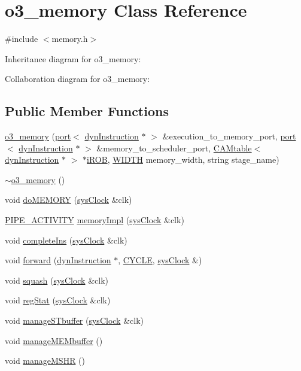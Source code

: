 \hypertarget{classo3__memory}{
\section{o3\_\-memory Class Reference}
\label{classo3__memory}
}


{\ttfamily \#include $<$memory.h$>$}



Inheritance diagram for o3\_\-memory:


Collaboration diagram for o3\_\-memory:
\subsection*{Public Member Functions}
\begin{DoxyCompactItemize}
\item 
\hyperlink{classo3__memory_aa34c08bd63c8de093d6df7e9022045fe}{o3\_\-memory} (\hyperlink{classport}{port}$<$ \hyperlink{classdynInstruction}{dynInstruction} $\ast$ $>$ \&execution\_\-to\_\-memory\_\-port, \hyperlink{classport}{port}$<$ \hyperlink{classdynInstruction}{dynInstruction} $\ast$ $>$ \&memory\_\-to\_\-scheduler\_\-port, \hyperlink{classCAMtable}{CAMtable}$<$ \hyperlink{classdynInstruction}{dynInstruction} $\ast$ $>$ $\ast$\hyperlink{backend_2parser_8cpp_ad73ae25f81e6e99482f3fbd5ba9664ce}{iROB}, \hyperlink{global_2global_8h_a6fa2e24b8a418fa215e183264cbea3aa}{WIDTH} memory\_\-width, string stage\_\-name)
\item 
\hyperlink{classo3__memory_a084e09aa6674090d325f82ce9a184fa3}{$\sim$o3\_\-memory} ()
\item 
void \hyperlink{classo3__memory_a14fb30065edbb1758d0e4c9ac3f92433}{doMEMORY} (\hyperlink{classsysClock}{sysClock} \&clk)
\item 
\hyperlink{unit_2stage_8h_ab00e4188e8b8974fecb1dfd12764cbb1}{PIPE\_\-ACTIVITY} \hyperlink{classo3__memory_ad44b31e95afd6e63f85401be8e58318d}{memoryImpl} (\hyperlink{classsysClock}{sysClock} \&clk)
\item 
void \hyperlink{classo3__memory_acbf1c9b78534fad182e6d2ac3453b98b}{completeIns} (\hyperlink{classsysClock}{sysClock} \&clk)
\item 
void \hyperlink{classo3__memory_a755d83e89f2fc0d95db93d688c40b9a4}{forward} (\hyperlink{classdynInstruction}{dynInstruction} $\ast$, \hyperlink{global_2global_8h_a7e19a550ec11d1ed921deb20c22efb5b}{CYCLE}, \hyperlink{classsysClock}{sysClock} \&)
\item 
void \hyperlink{classo3__memory_ab2f9b9b56a73d1f14564f68680fc9fc4}{squash} (\hyperlink{classsysClock}{sysClock} \&clk)
\item 
void \hyperlink{classo3__memory_a806f0676eb61e344a0feb87fd823779a}{regStat} (\hyperlink{classsysClock}{sysClock} \&clk)
\item 
void \hyperlink{classo3__memory_a91a7367c72346b355709afddef9296bf}{manageSTbuffer} (\hyperlink{classsysClock}{sysClock} \&clk)
\item 
void \hyperlink{classo3__memory_a826fdfa882dd202970984027e32e2c33}{manageMEMbuffer} ()
\item 
void \hyperlink{classo3__memory_adcda5a9a18c362c89d469abd355ae1a1}{manageMSHR} ()
\end{DoxyCompactItemize}


